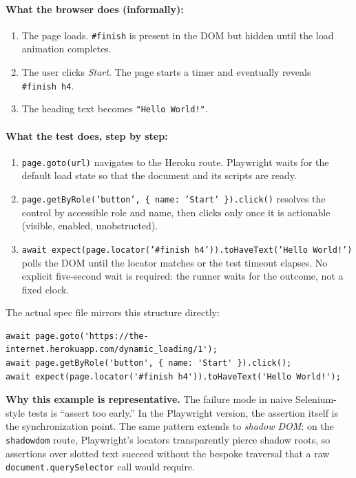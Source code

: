 \documentclass[12pt,letterpaper]{article}
\newcommand{\code}[1]{\texttt{#1}}
\begin{document}
\paragraph{What the browser does (informally):}
\begin{enumerate}[leftmargin=1.4em,itemsep=1pt]
  \item The page loads. \code{\#finish} is present in the DOM but hidden until the load animation completes.
  \item The user clicks \emph{Start}. The page starts a timer and eventually reveals \code{\#finish~h4}.
  \item The heading text becomes \code{"Hello World!"}.
\end{enumerate}

\paragraph{What the test does, step by step:}
\begin{enumerate}[leftmargin=1.4em,itemsep=1pt]
  \item \code{page.goto(url)} navigates to the Heroku route. Playwright waits for the default load state so that the document and its scripts are ready.
  \item \code{page.getByRole('button', \{ name: 'Start' \}).click()} resolves the control by accessible role and name, then clicks only once it is actionable (visible, enabled, unobstructed).
  \item \code{await expect(page.locator('\#finish h4')).toHaveText('Hello World!')} polls the DOM until the locator matches or the test timeout elapses. No explicit five-second wait is required: the runner waits for the outcome, not a fixed clock.
\end{enumerate}

The actual spec file mirrors this structure directly:

\begin{lstlisting}
await page.goto('https://the-internet.herokuapp.com/dynamic_loading/1');
await page.getByRole('button', { name: 'Start' }).click();
await expect(page.locator('#finish h4')).toHaveText('Hello World!');
\end{lstlisting}

\textbf{Why this example is representative.} The failure mode in naive Selenium-style tests is ``assert too early.'' In the Playwright version, the assertion itself is the synchronization point. The same pattern extends to \emph{shadow DOM}: on the \code{shadowdom} route, Playwright's locators transparently pierce shadow roots, so assertions over slotted text succeed without the bespoke traversal that a raw \code{document.querySelector} call would require.
\end{document}
